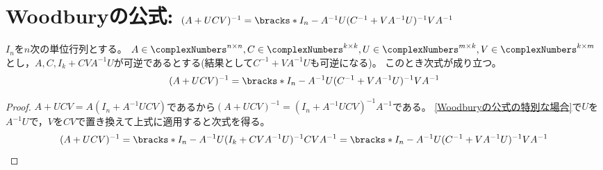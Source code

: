     \section{Woodburyの公式\texorpdfstring{: $(A+UCV)^{-1} = \bracks*{I_n - A^{-1}U(C^{-1} + VA^{-1}U)^{-1}V}A^{-1}$}{}}
        \begin{shadebox}
            $I_n$を$n$次の単位行列とする。
            $A\in\complexNumbers^{n\times n}, C\in\complexNumbers^{k\times k}, U\in\complexNumbers^{m\times k}, V\in\complexNumbers^{k\times m}$とし，$A,C,I_k + CVA^{-1}U$が可逆であるとする(結果として$C^{-1} + VA^{-1}U$も可逆になる)。
            このとき次式が成り立つ。
            \[ (A+UCV)^{-1} = \bracks*{I_n - A^{-1}U(C^{-1} + VA^{-1}U)^{-1}V}A^{-1} \]
        \end{shadebox}
        \begin{proof}
            $A+UCV = A(I_n + A^{-1}UCV)$であるから$(A+UCV)^{-1} = (I_n + A^{-1}UCV)^{-1}A^{-1}$である。
            \ref{Woodburyの公式の特別な場合}で$U$を$A^{-1}U$で，$V$を$CV$で置き換えて上式に適用すると次式を得る。
            \[ (A+UCV)^{-1} = \bracks*{I_n - A^{-1}U(I_k + CVA^{-1}U)^{-1}CV}A^{-1} = \bracks*{I_n - A^{-1}U(C^{-1} + VA^{-1}U)^{-1}V}A^{-1} \]
        \end{proof}